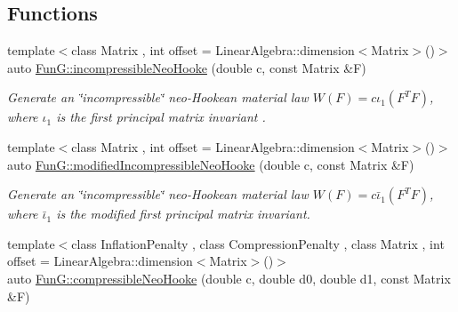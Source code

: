 \subsection*{Functions}
\begin{DoxyCompactItemize}
\item 
\hypertarget{group__Rubber_ga5bb28aef7006413775791998936d6b81}{{\footnotesize template$<$class Matrix , int offset = Linear\-Algebra\-::dimension$<$\-Matrix$>$()$>$ }\\auto \hyperlink{group__Rubber_ga5bb28aef7006413775791998936d6b81}{Fun\-G\-::incompressible\-Neo\-Hooke} (double c, const Matrix \&F)}\label{group__Rubber_ga5bb28aef7006413775791998936d6b81}

\begin{DoxyCompactList}\small\item\em Generate an \char`\"{}incompressible\char`\"{} neo-\/\-Hookean material law $ W(F)=c\iota_1(F^T F) $, where $\iota_1$ is the first principal matrix invariant . \end{DoxyCompactList}\item 
\hypertarget{group__Rubber_gaf6f5ab6a379ef03d513acc5042731a01}{{\footnotesize template$<$class Matrix , int offset = Linear\-Algebra\-::dimension$<$\-Matrix$>$()$>$ }\\auto \hyperlink{group__Rubber_gaf6f5ab6a379ef03d513acc5042731a01}{Fun\-G\-::modified\-Incompressible\-Neo\-Hooke} (double c, const Matrix \&F)}\label{group__Rubber_gaf6f5ab6a379ef03d513acc5042731a01}

\begin{DoxyCompactList}\small\item\em Generate an \char`\"{}incompressible\char`\"{} neo-\/\-Hookean material law $ W(F)=c\bar\iota_1(F^T F) $, where $\bar\iota_1$ is the modified first principal matrix invariant. \end{DoxyCompactList}\item 
\hypertarget{group__Rubber_gac5c39cd9de55f4f0220a806cf28a7b30}{{\footnotesize template$<$class Inflation\-Penalty , class Compression\-Penalty , class Matrix , int offset = Linear\-Algebra\-::dimension$<$\-Matrix$>$()$>$ }\\auto \hyperlink{group__Rubber_gac5c39cd9de55f4f0220a806cf28a7b30}{Fun\-G\-::compressible\-Neo\-Hooke} (double c, double d0, double d1, const Matrix \&F)}\label{group__Rubber_gac5c39cd9de55f4f0220a806cf28a7b30}


\end{DoxyCompactItemize}
